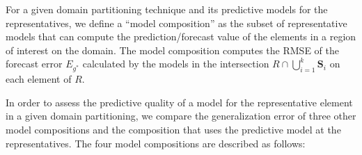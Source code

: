 For a given domain partitioning technique and its predictive models for the representatives, we define a ``model composition'' as the subset of representative models that can compute the prediction/forecast value of the elements in a region of interest on the domain. The model composition computes the RMSE of the forecast error $E_{g^{*}}$ calculated by the models in the intersection $R \cap \bigcup_{i=1}^{k} \mathbf{S}_{i}$ on each element of $R$. 

In order to assess the predictive quality of a model for the representative element in a given domain partitioning, we compare the generalization error of three other model compositions and the composition that uses the predictive model at the representatives. The four model compositions are described as follows:

